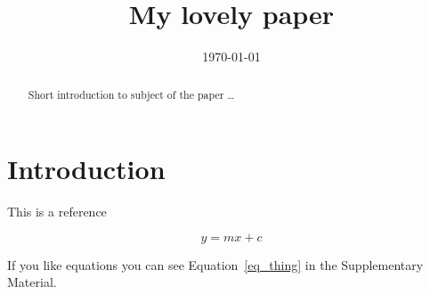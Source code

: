\documentclass{article}
\title{My lovely paper}
\date{\today}
\begin{document}
\maketitle

\begin{abstract}
Short introduction to subject of the paper \ldots
\end{abstract}

\section{Introduction}
This is a reference \citep{Vincent:2015dh}

\begin{equation}
\label{eq1}
  y = mx+c
\end{equation}

If you like equations you can see Equation~\ref{eq_thing} in the Supplementary Material.




\end{document}
